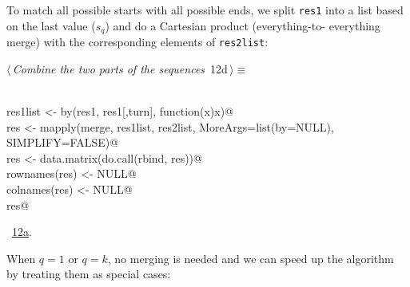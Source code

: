 \documentclass[reqno]{amsart}
\renewcommand{\NWtarget}[2]{\hypertarget{#1}{#2}}
\renewcommand{\NWlink}[2]{\hyperlink{#1}{#2}}
\begin{document}
To match all possible starts with all possible ends, we split \texttt{res1} into
a list based on the last value ($s_q$) and do a Cartesian product (everything-to-
everything merge) with the corresponding elements of \texttt{res2list}:
\begin{flushleft} \small
\begin{minipage}{\linewidth}\label{scrap19}\raggedright\small
\NWtarget{nuweb12d}{} $\langle\,${\itshape Combine the two parts of the sequences}\nobreak\ {\footnotesize {12d}}$\,\rangle\equiv$
\vspace{-1ex}
\begin{list}{}{} \item
\mbox{}\verb@@\\
\mbox{}\verb@  res1list <- by(res1, res1[,turn], function(x)x)@\\
\mbox{}\verb@  res <- mapply(merge, res1list, res2list, MoreArgs=list(by=NULL), SIMPLIFY=FALSE)@\\
\mbox{}\verb@  res <- data.matrix(do.call(rbind, res))@\\
\mbox{}\verb@  rownames(res) <- NULL@\\
\mbox{}\verb@  colnames(res) <- NULL@\\
\mbox{}\verb@  res@\\
\mbox{}\verb@@{\NWsep}
\end{list}
\vspace{-1.5ex}
\footnotesize
\begin{list}{}{\setlength{\itemsep}{-\parsep}\setlength{\itemindent}{-\leftmargin}}
\item \NWtxtMacroRefIn\ \NWlink{nuweb12a}{12a}.

\item{}
\end{list}
\end{minipage}\vspace{4ex}
\end{flushleft}
When $q=1$ or $q=k$, no merging is needed and we can speed up the algorithm by
treating them as special cases:
\end{document}
